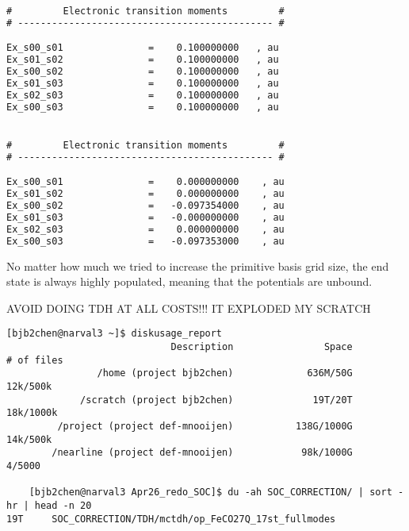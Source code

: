 \begin{lstlisting}[frame=single, language=xml,]
#         Electronic transition moments         #
# --------------------------------------------- #

Ex_s00_s01               =    0.100000000   , au
Ex_s01_s02               =    0.100000000   , au
Ex_s00_s02               =    0.100000000   , au
Ex_s01_s03               =    0.100000000   , au
Ex_s02_s03               =    0.100000000   , au
Ex_s00_s03               =    0.100000000   , au


#         Electronic transition moments         #
# --------------------------------------------- #

Ex_s00_s01               =    0.000000000    , au
Ex_s01_s02               =    0.000000000    , au
Ex_s00_s02               =   -0.097354000    , au
Ex_s01_s03               =   -0.000000000    , au
Ex_s02_s03               =    0.000000000    , au
Ex_s00_s03               =   -0.097353000    , au
\end{lstlisting}


No matter how much we tried to increase the primitive basis grid size, the end state is always highly populated, meaning that the potentials are unbound.



    


\newpage
AVOID DOING TDH AT ALL COSTS!!! IT EXPLODED MY SCRATCH
\begin{lstlisting}
[bjb2chen@narval3 ~]$ diskusage_report
                             Description                Space           # of files
                /home (project bjb2chen)             636M/50G             12k/500k
             /scratch (project bjb2chen)              19T/20T            18k/1000k
         /project (project def-mnooijen)           138G/1000G             14k/500k
        /nearline (project def-mnooijen)            98k/1000G               4/5000

    [bjb2chen@narval3 Apr26_redo_SOC]$ du -ah SOC_CORRECTION/ | sort -hr | head -n 20
19T     SOC_CORRECTION/TDH/mctdh/op_FeCO27Q_17st_fullmodes

\end{lstlisting}


